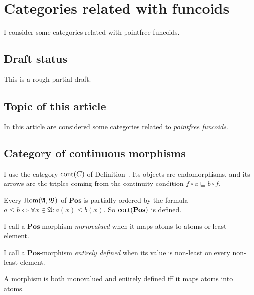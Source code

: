 \chapter{Categories related with funcoids}

I consider some categories related with pointfree funcoids.

\section{Draft status}

This is a rough partial draft.

\section{Topic of this article}

In this article are considered some categories related to \emph{pointfree
funcoids}.

\section{Category of continuous morphisms}

I use the category $\operatorname{cont}(C)$ of
Definition~. Its objects are
endomorphisms, and its arrows are the triples coming from the
continuity condition $f\circ a\sqsubseteq b\circ f$.

\begin{rem}
  Every $\operatorname{Hom} (\mathfrak{A}, \mathfrak{B})$ of $\mathbf{Pos}$
  is partially ordered by the formula $a \leqslant b \Leftrightarrow \forall x
  \in \mathfrak{A}: a (x) \leqslant b (x)$. So $\operatorname{cont}
  (\mathbf{Pos})$ is defined.
\end{rem}

\begin{defn}
  I call a $\mathbf{Pos}$-morphism \emph{monovalued} when it maps
  atoms to atoms or least element.
\end{defn}

\begin{defn}
  I call a $\mathbf{Pos}$-morphism \emph{entirely defined} when
  its value is non-least on every non-least element.
\end{defn}

\begin{obvious}
A morphism is both monovalued and entirely defined iff it maps atoms into
atoms.
\end{obvious}

